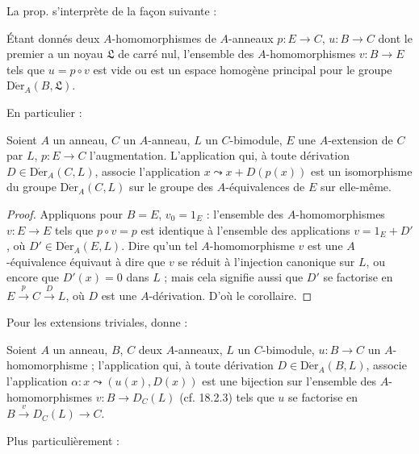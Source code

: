La prop.  s'interprète de la façon suivante :

\begin{corollary}[20.1.3]
\label{0.20.1.3-fr}
Étant donnés deux $A$-homomorphismes de $A$-anneaux $p:E\to C$,
$u:B\to C$ dont le premier a un noyau $\mathfrak{L}$ de carré nul,
l'ensemble des $A$-homomorphismes $v:B\to E$ tels que $u=p\circ v$ est vide
ou est un espace homogène principal pour le groupe
$\operatorname{D\acute{e}r}_A(B,\mathfrak{L})$.
\end{corollary}

En particulier :

\begin{corollary}[20.1.4]
\label{0.20.1.4-fr}
Soient $A$ un anneau, $C$ un $A$-anneau, $L$ un $C$-bimodule, $E$ une
$A$-extension de $C$ par $L$, $p:E\to C$ l'augmentation. L'application qui,
à toute dérivation $D\in\operatorname{D\acute{e}r}_A(C,L)$, associe l'application
$x\leadsto x+D(p(x))$ est un isomorphisme du groupe
$\operatorname{D\acute{e}r}_A(C,L)$ sur le groupe des $A$-équivalences de $E$ sur
elle-même.
\end{corollary}

\begin{proof}
Appliquons  pour $B=E$, $v_0=1_E$ : l'ensemble
des $A$-homomorphismes $v:E\to E$ tels que $p\circ v=p$ est identique à
l'ensemble des applications $v=1_E+D'$, où
$D'\in\operatorname{D\acute{e}r}_A(E,L)$. Dire qu'un tel $A$-homomorphisme $v$ est
une $A$-équivalence équivaut à dire que $v$ se réduit à l'injection canonique
sur $L$, ou encore que $D'(x)=0$ dans $L$ ; mais cela signifie aussi que
$D'$ se factorise en $E\xrightarrow{p}C\xrightarrow{D}L$, où $D$ est une
$A$-dérivation. D'où le corollaire.
\end{proof}

Pour les extensions triviales,  donne :

\begin{corollary}[20.1.5]
\label{0.20.1.5-fr}
Soient $A$ un anneau, $B$, $C$ deux $A$-anneaux, $L$ un $C$-bimodule,
$u:B\to C$ un $A$-homomorphisme ; l'application qui, à toute dérivation
$D\in\operatorname{D\acute{e}r}_A(B,L)$, associe l'application
$\alpha:x\leadsto(u(x),D(x))$ est une bijection sur l'ensemble des
$A$-homomorphismes $v:B\to D_C(L)$ \textup{(cf. 18.2.3)} tels que $u$ se factorise en
$B\xrightarrow{v}D_C(L)\to C$.
\end{corollary}

Plus particulièrement :

